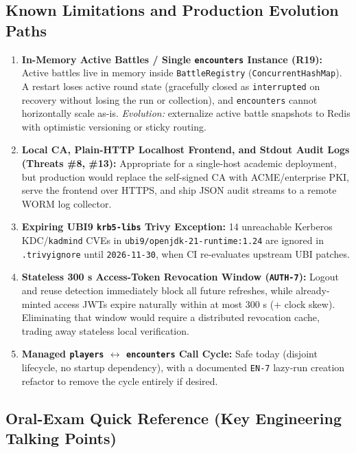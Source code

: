 \documentclass[10.5pt,a4paper]{article}
\DeclareRobustCommand{\code}[1]{\begingroup\def\_{\textunderscore\allowbreak}\texttt{#1}\endgroup}
\begin{document}
\subsection{Known Limitations and Production Evolution Paths}

\begin{enumerate}
  \item \textbf{In-Memory Active Battles / Single \code{encounters} Instance (R19):} Active battles live in memory inside \code{BattleRegistry} (\code{ConcurrentHashMap}). A restart loses active round state (gracefully closed as \code{interrupted} on recovery without losing the run or collection), and \code{encounters} cannot horizontally scale as-is. \emph{Evolution:} externalize active battle snapshots to Redis with optimistic versioning or sticky routing.
  \item \textbf{Local CA, Plain-HTTP Localhost Frontend, and Stdout Audit Logs (Threats \#8, \#13):} Appropriate for a single-host academic deployment, but production would replace the self-signed CA with ACME/enterprise PKI, serve the frontend over HTTPS, and ship JSON audit streams to a remote WORM log collector.
  \item \textbf{Expiring UBI9 \code{krb5-libs} Trivy Exception:} 14 unreachable Kerberos KDC/\code{kadmind} CVEs in \code{ubi9/openjdk-21-runtime:1.24} are ignored in \code{.trivyignore} until \code{2026-11-30}, when CI re-evaluates upstream UBI patches.
  \item \textbf{Stateless 300 s Access-Token Revocation Window (\code{AUTH-7}):} Logout and reuse detection immediately block all future refreshes, while already-minted access JWTs expire naturally within at most 300 s (+ clock skew). Eliminating that window would require a distributed revocation cache, trading away stateless local verification.
  \item \textbf{Managed \code{players} $\leftrightarrow$ \code{encounters} Call Cycle:} Safe today (disjoint lifecycle, no startup dependency), with a documented \code{EN-7} lazy-run creation refactor to remove the cycle entirely if desired.
\end{enumerate}

\subsection{Oral-Exam Quick Reference (Key Engineering Talking Points)}
\end{document}
